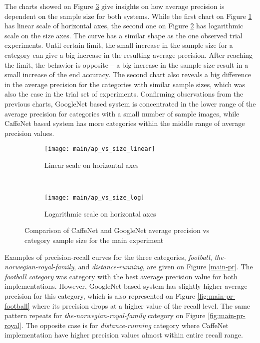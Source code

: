     The charts showed on Figure \ref{fig:main-ap-vs-size} give insights on how average precision is dependent on the sample size for both systems. While the first chart on Figure \ref{fig:main-ap-vs-size-linear} has linear scale of horizontal axes, the second one on Figure \ref{fig:main-ap-vs-size-log} has logarithmic scale on the size axes. The curve has a similar shape as the one observed trial experiments. Until certain limit, the small increase in the sample size for a category can give a big increase in the resulting average precision. After reaching the limit, the behavior is opposite -- a big increase in the sample size result in a small increase of the end accuracy. The second chart also reveals a big difference in the average precision for the categories with similar sample sizes, which was also the case in the trial set of experiments. Confirming observations from the previous charts, GoogleNet based system is concentrated in the lower range of the average precision for categories with a small number of sample images, while CaffeNet based system has more categories within the middle range of average precision values.
    
    \begin{figure}[H]
        \centering
        \begin{subfigure}[a]{\textwidth}
            \texttt{[image: main/ap\_vs\_size\_linear]}
            \caption{Linear scale on horizontal axes}
            \label{fig:main-ap-vs-size-linear}
        \end{subfigure}
        \\
        \begin{subfigure}[a]{\textwidth}
            \texttt{[image: main/ap\_vs\_size\_log]}
            \caption{Logarithmic scale on horizontal axes}
            \label{fig:main-ap-vs-size-log}
        \end{subfigure}
        \caption[Main experiment. Average precision vs size for CaffeNet and GoogleNet]{Comparison of CaffeNet and GoogleNet average precision vs category sample size for the main experiment}
        \label{fig:main-ap-vs-size}
    \end{figure}
    
    Examples of precision-recall curves for the three categories, \textit{football}, \textit{the-norwegian-royal-family}, and \textit{distance-running}, are given on Figure \ref{main-pr}. The \textit{football category} was category with the best average precision value for both implementations. However, GoogleNet based system has slightly higher average precision for this category, which is also represented on Figure \ref{fig:main-pr-football} where its precision drops at a higher value of the recall level. The same pattern repeats for \textit{the-norwegian-royal-family} category on Figure \ref{fig:main-pr-royal}. The opposite case is for \textit{distance-running} category where CaffeNet implementation have higher precision values almost within entire recall range.
    
